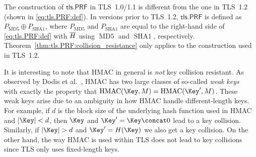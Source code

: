 \begin{remark}\label{remark:EAP-TLS:tls.PRF:key_collision}
The construction of $\mathsf{tls.PRF}$ in TLS~1.0/1.1 is different from the one in TLS~1.2
(shown in \cref{eq:tls.PRF:def}).
In versions prior to TLS~1.2,
$\mathsf{tls.PRF}$ is defined as $P_{\mathrm{MD5}} \oplus P_{\mathrm{SHA1}}$,
where $P_{\mathrm{MD5}}$ and $P_{\mathrm{SHA1}}$ are equal to the right-hand side of \cref{eq:tls.PRF:def} with $\overline{H}$ using $\operatorname{\mathrm{MD5}}$ and $\operatorname{\mathrm{SHA1}}$,
respectively. 
Theorem~\ref{thm:tls.PRF:collision_resistance} only applies to the construction used in TLS~1.2.
\end{remark}

\begin{remark}
It is interesting to note that HMAC in general is \emph{not} key collision resistant. 
As observed by Dodis et al.~\cite{C:DRST12},
HMAC has two large classes of so-called \emph{weak keys} with exactly the property that $\operatorname{HMAC}(\Key, M) = \operatorname{HMAC}(\Key', M)$.
These weak keys arise due to an ambiguity in how HMAC handle different-length keys.
For example,
if $d$ is the block size of the underlying hash function used in HMAC and $| \Key | < d$,
then $\Key$ and $\Key' = \Key \concat 0$ lead to a key collision.
Similarly,
if $| \Key | > d$ and $\Key' = H(\Key)$ we also get a key collision.
On the other hand,
the way HMAC is used within TLS does not lead to key collisions since TLS only uses fixed-length keys.
\end{remark}

